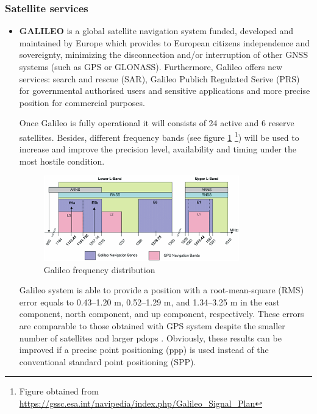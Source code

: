 \subsubsection{Satellite services}
\begin{itemize}
    \item \textbf{GALILEO} is a global satellite navigation system funded, developed and maintained by Europe which provides to European citizens independence and sovereignty, minimizing the disconnection and/or interruption of other GNSS systems (such as GPS or GLONASS). Furthermore, Galileo offers new services: search and rescue (SAR), Galileo Publich Regulated Serive (PRS) for governmental authorised users and sensitive applications and more precise position for commercial purposes.   
    
    Once Galileo is fully operational it will consists of 24 active and 6 reserve satellites. Besides, different frequency bands (see figure \ref{fig:frequency_plan} \footnote{Figure obtained from \url{https://gssc.esa.int/navipedia/index.php/Galileo_Signal_Plan}}) will be used to increase and improve the precision level, availability and timing under the most hostile condition. 
    
    \begin{figure}
    	\centering
    	\includegraphics[width=0.8\textwidth]{images/Galileo_Frequency_Plan.png}
    	\caption{Galileo frequency distribution}
    	\label{fig:frequency_plan}
    \end{figure} 
    
    Galileo system is able to provide a position with a root-mean-square (RMS) error equals to 0.43–1.20 m, 0.52–1.29 m, and 1.34–3.25 m in the east component, north component, and up component, respectively. These errors are comparable to those obtained with GPS system despite the smaller number of satellites and larger \gls{pdop}s \cite{Gal_pos}. Obviously, these results can be improved if a precise point positioning (\gls{ppp}) is used instead of the conventional standard point positioning (SPP). 


\end{itemize}
